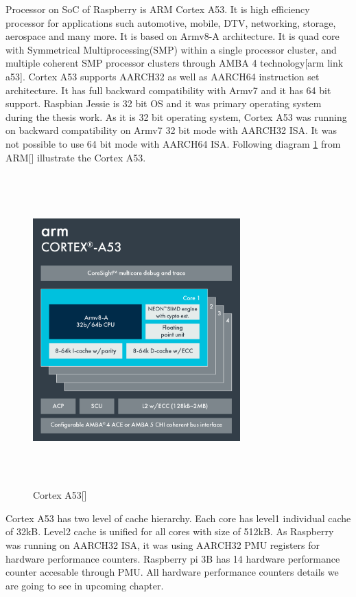 \par Processor on SoC of Raspberry is ARM Cortex A53. It is high efficiency processor for applications such automotive, mobile, DTV, networking, storage, aerospace and many more. It is based on Armv8-A architecture. It is quad core with Symmetrical Multiprocessing(SMP) within a single processor cluster, and multiple coherent SMP processor clusters through AMBA 4 technology[arm link a53]. Cortex A53 supports AARCH32 as well as AARCH64 instruction set architecture. It has full backward compatibility with Armv7 and it has 64 bit support. Raspbian Jessie is 32 bit OS and it was primary operating system during the thesis work. As it is 32 bit operating system, Cortex A53 was running on backward compatibility on Armv7 32 bit mode with AARCH32 ISA. It was not possible to use 64 bit mode with AARCH64 ISA. Following diagram \ref{fig:a53} from ARM[] illustrate the Cortex A53.

\begin{figure}[h!]
\includegraphics[width=8cm, height=12cm]{./images/A53}
\centering
\caption{Cortex A53[]}
\label{fig:a53}
\end{figure}

\par Cortex A53 has two level of cache hierarchy. Each core has level1 individual cache of 32kB. Level2 cache is unified for all cores with size of 512kB. As Raspberry was running on AARCH32 ISA, it was using AARCH32 PMU registers for hardware performance counters. Raspberry pi 3B has 14 hardware performance counter accesable through PMU. All hardware performance counters details we are going to see in upcoming chapter. 

